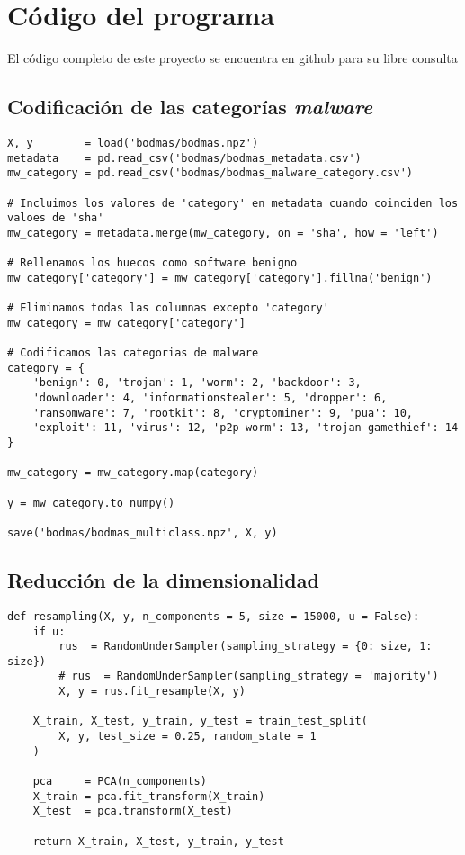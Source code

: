 \chapter{Código del programa}

El código completo de este proyecto se encuentra en github para su libre consulta \cite{github}

\section{Codificación de las categorías \textit{malware}}
\label{sec:codificacion}

\lstset{style=codestyle, language=Python}
\begin{lstlisting}[frame=single]
X, y        = load('bodmas/bodmas.npz')
metadata    = pd.read_csv('bodmas/bodmas_metadata.csv')
mw_category = pd.read_csv('bodmas/bodmas_malware_category.csv')

# Incluimos los valores de 'category' en metadata cuando coinciden los valoes de 'sha'
mw_category = metadata.merge(mw_category, on = 'sha', how = 'left')

# Rellenamos los huecos como software benigno
mw_category['category'] = mw_category['category'].fillna('benign')

# Eliminamos todas las columnas excepto 'category'
mw_category = mw_category['category']

# Codificamos las categorias de malware
category = {
	'benign': 0, 'trojan': 1, 'worm': 2, 'backdoor': 3,
	'downloader': 4, 'informationstealer': 5, 'dropper': 6,
	'ransomware': 7, 'rootkit': 8, 'cryptominer': 9, 'pua': 10,
	'exploit': 11, 'virus': 12, 'p2p-worm': 13, 'trojan-gamethief': 14
}

mw_category = mw_category.map(category)

y = mw_category.to_numpy()

save('bodmas/bodmas_multiclass.npz', X, y)

\end{lstlisting}

\section{Reducción de la dimensionalidad}
\label{sec:red_dim}

\lstset{style=codestyle, language=Python}
\begin{lstlisting}[frame=single]
def resampling(X, y, n_components = 5, size = 15000, u = False):
	if u:
		rus  = RandomUnderSampler(sampling_strategy = {0: size, 1: size})
		# rus  = RandomUnderSampler(sampling_strategy = 'majority')
		X, y = rus.fit_resample(X, y)

	X_train, X_test, y_train, y_test = train_test_split(
		X, y, test_size = 0.25, random_state = 1
	)

	pca     = PCA(n_components)
	X_train = pca.fit_transform(X_train)
	X_test  = pca.transform(X_test)

	return X_train, X_test, y_train, y_test
\end{lstlisting}

